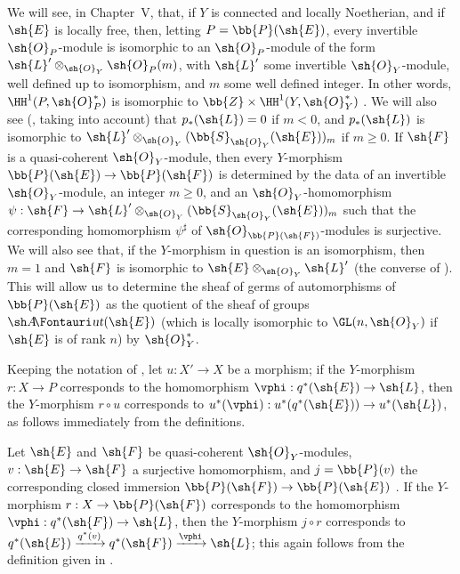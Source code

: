 \begin{remark}[4.2.7]
\label{II.4.2.7}
We will see, in Chapter~V, that, if $Y$ is connected and locally Noetherian, and if $\sh{E}$ is locally free, then, letting $P=\bb{P}(\sh{E})$, every invertible $\sh{O}_P$-module is isomorphic to an $\sh{O}_P$-module of the form $\sh{L}'\otimes_{\sh{O}_Y}\sh{O}_P(m)$, with $\sh{L}'$ some invertible $\sh{O}_Y$-module, well defined up to isomorphism, and $m$ some well defined integer.
In other words, $\HH^1(P,\sh{O}_P^*)$ is isomorphic to $\bb{Z}\times\HH^1(Y,\sh{O}_Y^*)$ .
We will also see (, taking  into account) that $p_*(\sh{L})=0$ if $m<0$, and $p_*(\sh{L})$ is isomorphic to $\sh{L}'\otimes_{\sh{O}_Y}(\bb{S}_{\sh{O}_Y}(\sh{E}))_m$ if $m\geq0$.
If $\sh{F}$ is a quasi-coherent $\sh{O}_Y$-module, then every $Y$-morphism $\bb{P}(\sh{E})\to\bb{P}(\sh{F})$ is determined by the data of an invertible $\sh{O}_Y$-module, an integer $m\geq0$, and an $\sh{O}_Y$-homomorphism $\psi:\sh{F}\to\sh{L}'\otimes_{\sh{O}_Y}(\bb{S}_{\sh{O}_Y}(\sh{E}))_m$ such that the corresponding homomorphism $\psi^\sharp$ of $\sh{O}_{\bb{P}(\sh{F})}$-modules is surjective.
We will also see that, if the $Y$-morphism in question is an isomorphism, then $m=1$ and $\sh{F}$ is isomorphic to $\sh{E}\otimes_{\sh{O}_Y}\sh{L}'$ (the converse of ).
This will allow us to determine the sheaf of germs of automorphisms of $\bb{P}(\sh{E})$ as the quotient of the sheaf of groups $\shAut(\sh{E})$ (which is locally isomorphic to $\GL(n,\sh{O}_Y)$ if $\sh{E}$ is of rank $n$) by $\sh{O}_Y^*$.
\end{remark}

\begin{env}[4.2.8]
\label{II.4.2.8}
Keeping the notation of , let $u:X'\to X$ be a morphism;
if the $Y$-morphism $r:X\to P$ corresponds to the homomorphism $\vphi:q^*(\sh{E})\to\sh{L}$, then the $Y$-morphism $r\circ u$ corresponds to $u^*(\vphi):u^*(q^*(\sh{E}))\to u^*(\sh{L})$, as follows immediately from the definitions.
\end{env}

\begin{env}[4.2.9]
\label{II.4.2.9}
Let $\sh{E}$ and $\sh{F}$ be quasi-coherent $\sh{O}_Y$-modules, $v:\sh{E}\to\sh{F}$ a surjective homomorphism, and $j=\bb{P}(v)$ the corresponding closed immersion $\bb{P}(\sh{F})\to\bb{P}(\sh{E})$ .
If the $Y$-morphism $r:X\to\bb{P}(\sh{F})$ corresponds to the homomorphism $\vphi:q^*(\sh{F})\to\sh{L}$, then the
$Y$-morphism $j\circ r$ corresponds to $q^*(\sh{E})\xrightarrow{q^*(v)}q^*(\sh{F})\xrightarrow{\vphi}\sh{L}$;
this again follows from the definition given in .
\end{env}

